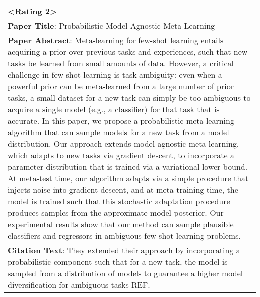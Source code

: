 \documentclass[11pt]{article}
\newcommand{\upv}{\vspace{-.0cm}}
\newcommand{\downv}{\vspace{-.1cm}}
\newcommand{\ourdata}{CiteSum\xspace}
\begin{document}
\begin{table*}[t]
{\begin{tabular}{p{15cm}}
                \textbf{<Rating 2>} \\
                \textbf{Paper Title}: Probabilistic Model-Agnostic Meta-Learning \\
                \textbf{Paper Abstract}: Meta-learning for few-shot learning entails acquiring a prior over previous tasks and experiences, such that new tasks be learned from small amounts of data. However, a critical challenge in few-shot learning is task ambiguity: even when a powerful prior can be meta-learned from a large number of prior tasks, a small dataset for a new task can simply be too ambiguous to acquire a single model (e.g., a classifier) for that task that is accurate. In this paper, we propose a probabilistic meta-learning algorithm that can sample models for a new task from a model distribution. Our approach extends model-agnostic meta-learning, which adapts to new tasks via gradient descent, to incorporate a parameter distribution that is trained via a variational lower bound. At meta-test time, our algorithm adapts via a simple procedure that injects noise into gradient descent, and at meta-training time, the model is trained such that this stochastic adaptation procedure produces samples from the approximate model posterior. Our experimental results show that our method can sample plausible classifiers and regressors in ambiguous few-shot learning problems. \\
                \textbf{Citation Text}: They extended their approach by incorporating a probabilistic component such that for a new task, the model is sampled from a distribution of models to guarantee a higher model diversification for ambiguous tasks REF. \\

            \bottomrule
        \end{tabular}
        }
    \upv
    \caption{Examples in \ourdata with different quality ratings. }
    \label{table_example_ratings}
    \downv
    \end{table*}
    
\end{document}
